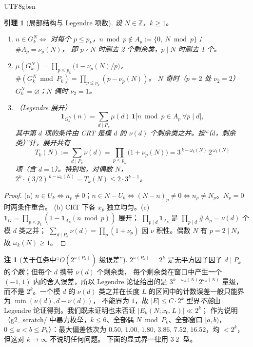 \documentclass[11pt,a4paper]{article}
\newcommand{\Haar}{\mu}
\newcommand{\status}[1]{\par\noindent\fbox{\textbf{状态：#1}}\par\smallskip}
\newcommand{\Tleg}{T}                   %
\theoremstyle{plain}
\newtheorem{lem}[prop]{引理}
\theoremstyle{definition}
\newtheorem{rem}[prop]{注}
\begin{document}
\begin{CJK}{UTF8}{gbsn}
\begin{lem}[局部结构与 Legendre 项数]\label{lem:local}
设 $N\in\mathbb Z$，$k\ge1$。
\begin{enumerate}[label=(\alph*)]
\item $n\in G_k^N\iff$ 对每个 $p\le p_k$，$n\bmod p\notin A_p:=\{0,\ N\bmod p\}$；$\#A_p=\nu_p(N)$，
即 $p\nmid N$ 时删去 2 个剩余类，$p\mid N$ 时删去 1 个。
\item $\Haar(G_k^N)=\prod_{p\le p_k}\bigl(1-\nu_p(N)/p\bigr)$，$\#(G_k^N\bmod P_k)=\prod_{p\le p_k}(p-\nu_p(N))$。
$N$ 奇时（$p=2$ 处 $\nu_2=2$）$G_k^N=\varnothing$；$N$ 偶时 $\nu_2=1$。
\item（Legendre 展开）
\[
\mathbf 1_{G_k^N}(n)=\sum_{d\mid P_k}\mu(d)\,\mathbf 1\bigl[n\bmod p\in A_p\ \forall p\mid d\bigr],
\]
其中第 $d$ 项的条件由 CRT 是模 $d$ 的 $\nu(d)$ 个剩余类之并。按“（$d$，剩余类）”计，展开共有
\[
\Tleg_k(N):=\sum_{d\mid P_k}\nu(d)=\prod_{p\le p_k}\bigl(1+\nu_p(N)\bigr)=3^{\,k-\omega_k(N)}\,2^{\,\omega_k(N)}
\]
项（含 $d=1$）。特别地，对偶数 $N$，$2^{k}\cdot(3/2)^{\,k-\omega_k(N)}=\Tleg_k(N)\le2\cdot3^{k-1}$。
\end{enumerate}
\end{lem}
\status{已证}
\begin{proof}
(a) $n\in U_k\iff n_p\neq0$；$n\in N-U_k\iff (N-n)_p\ne0\iff n_p\ne N_p$。$N_p=0$ 时两条件重合。
(b) CRT 下各 $x_p$ 独立均匀。(c) $\mathbf 1_{G}=\prod_{p\le p_k}(1-\mathbf 1_{A_p}(n\bmod p))$ 展开；
$\prod_{p\mid d}\mathbf 1_{A_p}$ 是 $\prod_{p\mid d}\#A_p=\nu(d)$ 个模 $d$ 类之并；
$\sum_{d\mid P_k}\nu(d)=\prod_p(1+\nu_p)$ 因 $\nu$ 积性。偶数 $N$ 有 $p=2\mid N$，故 $\omega_k(N)\ge1$。
\end{proof}

\begin{rem}[关于任务中“$O(2^{\omega(P_k)})$ 级误差”]\label{rem:twoomega}
$2^{\omega(P_k)}=2^k$ 是无平方因子因子 $d\mid P_k$ 的\emph{个数}；但每个 $d$ 携带 $\nu(d)$ 个剩余类，
每个剩余类在窗口中产生一个 $(-1,1)$ 内的舍入误差，所以 Legendre 论证给出的是 $3^{k-\omega_k(N)}2^{\omega_k(N)}$ 量级，
而不是 $2^k$。一个模 $d$ 的 $\nu(d)$ 类之并在长度 $L$ 的区间中的计数误差一般只能界为 $\min(\nu(d),d-\nu(d))$，
不能界为 $1$，故 $|E|\le C\cdot2^k$ 型界\emph{不能}由 Legendre 论证得到。我们既未证明也未否证 $|E_k(N;x_0,L)|\ll2^k$；
作为说明（g2\_scratch/ 中暴力枚举，$k\le6$、全部偶 $N\bmod P_k$、全部窗口 $[a,b)$，$0\le a<b\le P_k$）：最大偏差依次为
$0.50,\,1.00,\,1.80,\,3.86,\,7.52,\,16.52$，均 $<2^k$，但这对 $k\to\infty$ 不说明任何问题。
下面的显式界一律用 $3^{\cdot}2^{\cdot}$ 型。
\end{rem}


\end{CJK}
\end{document}
